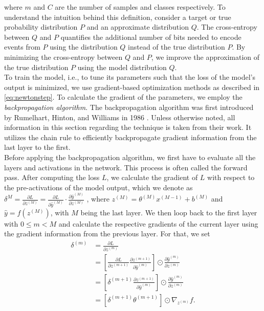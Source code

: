 where $m$ and $C$ are the number of samples and classes respectively.
To understand the intuition behind this definition, consider a target or true probability distribution \(P\) and an approximate distribution \(Q\).
The cross-entropy between \(Q\) and \(P\) quantifies the additional number of bits needed to encode events from \(P\) using the distribution \(Q\) instead of the true distribution \(P\).
By minimizing the cross-entropy between \(Q\) and \(P\), we improve the approximation of the true distribution \(P\) using the model distribution \(Q\).\cite{bishop2006pattern}\\
To train the model, i.e., to tune its parameters such that the loss of the model's output is minimized,
we use gradient-based optimization methods as described in \ref{eq:newtonstep}.
To calculate the gradient of the parameters, we employ the \emph{backpropagation algorithm}.
The backpropagation algorithm was first introduced by Rumelhart, Hinton, and Williams in 1986 \cite{rumelhart1986learning}.
Unless otherwise noted, all information in this section regarding the technique is taken from their work.
It utilizes the chain rule to efficiently backpropagate gradient information from the last layer to the first.\\
Before applying the backpropagation algorithm, we first have to evaluate all the layers and activations in the network.
This process is often called the forward pass.
After computing the loss \(L\), we calculate the gradient of \(L\) with respect to the pre-activations of the model output, which we denote as
$\delta^{M} = \frac{\partial L}{\partial z^{(M)}} = \frac{\partial L}{\partial \hat{y}^{(M)}} \cdot \frac{\partial \hat{y}^{(M)}}{\partial z^{(M)}}$
, where \(z^{(M)} = \theta^{(M)} x^{(M-1)} + b^{(M)}\) and \(\hat{y} = f(z^{(M)})\), with \(M\) being the last layer.
We then loop back to the first layer with \(0 \leq m < M\) and calculate the respective gradients of the current layer using the gradient information from the previous layer. For that, we set
\begin{align}
    \delta^{(m)} &= \frac{\partial L}{\partial z^{(m)}} \\
                 &= \left[ \frac{\partial L}{\partial z^{(m+1)}} \frac{\partial z^{(m+1)}}{\partial \hat{y}^{(m)}} \right] \odot \frac{\partial \hat{y}^{(m)}}{\partial z^{(m)}} \\
                 &= \left[ \delta^{(m+1)} \frac{\partial z^{(m+1)}}{\partial \hat{y}^{(m)}} \right] \odot \frac{\partial \hat{y}^{(m)}}{\partial z^{(m)}} \\
                 &= \left[\delta^{(m+1)} \theta^{(m+1)}  \right] \odot \nabla_{z^{(m)}} f.
\end{align}
